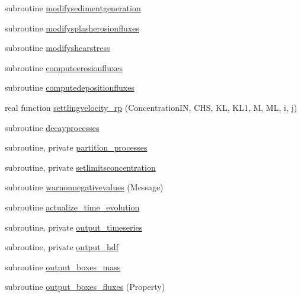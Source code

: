 \begin{DoxyCompactItemize}
\item 
subroutine \mbox{\hyperlink{namespacemodulerunoffproperties_a0edf1338341bbf4f8702def7a1f71c32}{modifysedimentgeneration}}
\item 
subroutine \mbox{\hyperlink{namespacemodulerunoffproperties_a9ac3ca2c6f3cf83428d37c39365ba1ec}{modifysplasherosionfluxes}}
\item 
subroutine \mbox{\hyperlink{namespacemodulerunoffproperties_aab15f42e0b7672bdfdff651ff710415c}{modifyshearstress}}
\item 
subroutine \mbox{\hyperlink{namespacemodulerunoffproperties_aa72049d47379b80cbd6f207ff9ac534b}{computeerosionfluxes}}
\item 
subroutine \mbox{\hyperlink{namespacemodulerunoffproperties_a8bbf07614377370c486122ce0f904d0d}{computedepositionfluxes}}
\item 
real function \mbox{\hyperlink{namespacemodulerunoffproperties_a319ef0d7c134a22fa402d33b27472388}{settlingvelocity\+\_\+rp}} (Concentration\+IN, C\+HS, KL, K\+L1, M, ML, i, j)
\item 
subroutine \mbox{\hyperlink{namespacemodulerunoffproperties_a22e352c7bc8cde1c67133693821b9c46}{decayprocesses}}
\item 
subroutine, private \mbox{\hyperlink{namespacemodulerunoffproperties_a6a27cac0933a3a6597bcb4971c40e53b}{partition\+\_\+processes}}
\item 
subroutine, private \mbox{\hyperlink{namespacemodulerunoffproperties_aa9620af1c193dc89f2ab50f709f50f32}{setlimitsconcentration}}
\item 
subroutine \mbox{\hyperlink{namespacemodulerunoffproperties_a1a87c5174a0925e3408e5da2941a3e01}{warnonnegativevalues}} (Message)
\item 
subroutine \mbox{\hyperlink{namespacemodulerunoffproperties_a05009fe293792ec5af707219d9fe4ab0}{actualize\+\_\+time\+\_\+evolution}}
\item 
subroutine, private \mbox{\hyperlink{namespacemodulerunoffproperties_aab6832deb9eca45c9392ee3c49085c37}{output\+\_\+timeseries}}
\item 
subroutine, private \mbox{\hyperlink{namespacemodulerunoffproperties_a7e5f01410c6d0dcb0205da11531d61d7}{output\+\_\+hdf}}
\item 
subroutine \mbox{\hyperlink{namespacemodulerunoffproperties_ad59aaacda5f23a659f2d8cf4d4c29dfa}{output\+\_\+boxes\+\_\+mass}}
\item 
subroutine \mbox{\hyperlink{namespacemodulerunoffproperties_ab76e643833d72d16c6b9e934a268c931}{output\+\_\+boxes\+\_\+fluxes}} (Property)

\end{DoxyCompactItemize}
